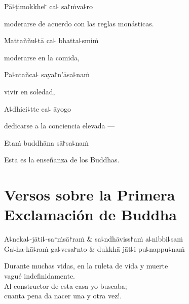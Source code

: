 Pā꜕ṭimokkhe꜓ ca꜕ sa꜓ṁva꜕ro

\begin{english}
  moderarse de acuerdo con las reglas monásticas.
\end{english}

Mattaññu꜕tā ca꜕ bhatta꜕smiṁ

\begin{english}
  moderarse en la comida,
\end{english}

Pa꜕ntañca꜕ saya꜓n'āsa꜕naṁ

\begin{english}
  vivir en soledad,
\end{english}

A꜕dhici꜕tte ca꜕ āyogo

\begin{english}
  dedicarse a la conciencia elevada ---
\end{english}

Etaṁ buddhāna sā꜓sa꜕naṁ

\begin{english}
  Esta es la enseñanza de los Buddhas.
\end{english}

\chapter[La Primera Exclamación]{Versos sobre la Primera Exclamación de Buddha}


\begin{leader}
\end{leader}

\begin{twochants}
  A꜕neka꜕-jāti꜕-sa꜓ṁsā꜓raṁ & sa꜕ndhāviss꜓aṁ a꜕nibbi꜕saṁ \\
  Ga꜕ha-kā꜕raṁ ga꜕vesa꜓nto & dukkhā jāt꜕i pu꜕nappu꜕naṁ \\
\end{twochants}

\begin{english}
  Durante muchas vidas, en la ruleta de vida y muerte\\
  vagué indefinidamente.\\
  Al constructor de esta casa yo buscaba;\\
  cuanta pena da nacer una y otra vez!.
\end{english}

